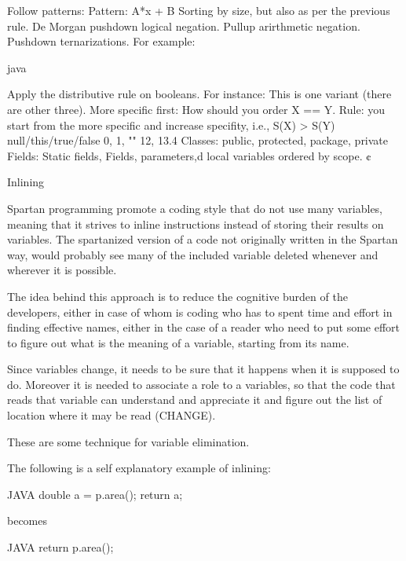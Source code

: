 \begin{description}
    Follow patterns: Pattern: A*x + B
    Sorting by size, but also as per the previous rule.
    De Morgan pushdown logical negation.
    Pullup arirthmetic negation.
    Pushdown ternarizations. For example:
        \begin{code}{java}
  \end{code}
    Apply the distributive rule on booleans. For instance:
 This is one variant (there are other three).
    More specific first: How should you order X == Y.
        Rule: you start from the more specific and increase specifity, i.e.,
        S(X) > S(Y)
            null/this/true/false
            0, 1, ""
            12, 13.4
            Classes: public, protected, package, private
            Fields: Static fields, Fields,
            parameters,d
            local variables ordered by scope.
            ¢
\item{Inlining}

Spartan programming promote a coding style that do not use many variables,
meaning that it strives to inline instructions instead of storing their results
on variables. The spartanized version of a code not originally written in the
Spartan way, would probably see many of the included variable deleted whenever
and wherever it is possible.

The idea behind this approach is to reduce the cognitive burden of the
developers, either in case of whom is coding who has to spent time and effort
in finding effective names, either in the case of a reader who need to put some
effort to figure out what is the meaning of a variable, starting from its name.

Since variables change, it needs to be sure that it happens when it is supposed
to do. Moreover it is needed to associate a role to a variables, so that the
code that reads that variable can understand and appreciate it and figure out
the list of location where it may be read (CHANGE).

These are some technique for variable elimination.

The following is a self explanatory example of inlining:

\begin{code}{JAVA}
double a = p.area();
return a;
\end{code}

becomes

\begin{code}{JAVA}
return p.area();
\end{code}


\end{description}
